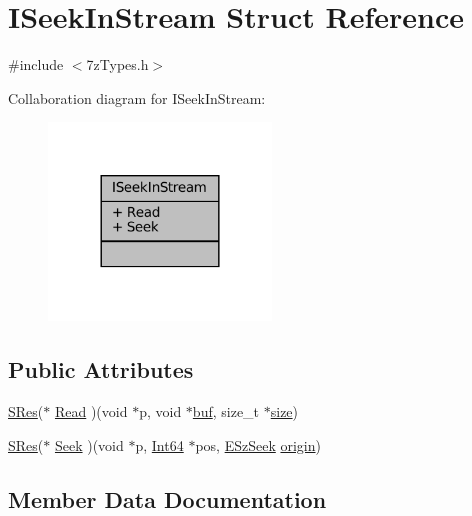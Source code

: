 \hypertarget{struct_i_seek_in_stream}{}\section{I\+Seek\+In\+Stream Struct Reference}
\label{struct_i_seek_in_stream}


{\ttfamily \#include $<$7z\+Types.\+h$>$}



Collaboration diagram for I\+Seek\+In\+Stream\+:
\nopagebreak
\begin{figure}[H]
\begin{center}
\leavevmode
\includegraphics[width=168pt]{struct_i_seek_in_stream__coll__graph}
\end{center}
\end{figure}
\subsection*{Public Attributes}
\begin{DoxyCompactItemize}
\item 
\mbox{\hyperlink{7z_types_8h_acc0053eeb62726b68b22e8c7d9e91367}{S\+Res}}($\ast$ \mbox{\hyperlink{struct_i_seek_in_stream_aa036c6df92a819e91810122c96b60bc7}{Read}} )(void $\ast$p, void $\ast$\mbox{\hyperlink{ioapi_8h_a8ad8a13c88886b9f623034ff88570adb}{buf}}, size\+\_\+t $\ast$\mbox{\hyperlink{ioapi_8h_a014d89bd76f74ef3a29c8f04b473eb76}{size}})
\item 
\mbox{\hyperlink{7z_types_8h_acc0053eeb62726b68b22e8c7d9e91367}{S\+Res}}($\ast$ \mbox{\hyperlink{struct_i_seek_in_stream_a7fdebfa496b02cbc30ff2e966d94cefe}{Seek}} )(void $\ast$p, \mbox{\hyperlink{7z_types_8h_ade5ca5eec203b16d15253b7c422808bf}{Int64}} $\ast$pos, \mbox{\hyperlink{7z_types_8h_ab0216441b8737c13f5b275408f9e9709}{E\+Sz\+Seek}} \mbox{\hyperlink{ioapi_8h_a5f189a59b66f135978bce54f9d0fcade}{origin}})
\end{DoxyCompactItemize}


\subsection{Member Data Documentation}
\mbox{\label{struct_i_seek_in_stream_aa036c6df92a819e91810122c96b60bc7}} 
